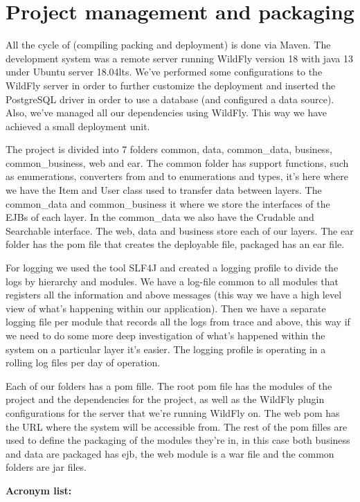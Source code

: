 \documentclass{article}
\begin{document}
\section{Project management and packaging}

\qquad All the cycle of (compiling packing and deployment) is done via Maven. The development system was a remote server running WildFly version 18 with java 13 under Ubuntu server 18.04lts. We've performed some configurations to the WildFly server in order to further customize the deployment and inserted the PostgreSQL driver in order to use a database (and configured a data source). Also, we've managed all our dependencies using WildFly. This way we have achieved a small deployment unit.

\qquad The project is divided into 7 folders common, data, common\_data, business, common\_business, web and ear. The common folder has support functions, such as enumerations, converters from and to enumerations and types, it's here where we have the Item and User class used to transfer data between layers. The common\_data and common\_business it where we store the interfaces of the \ac{EJB}s of each layer. In the common\_data we also have the Crudable and Searchable interface. The web, data and business store each of our layers. The ear folder has the pom file that creates the deployable file, packaged has an ear file.

\qquad For logging we used the tool \ac{SLF4J} and created a logging profile to divide the logs by hierarchy and modules. We have a log-file common to all modules that registers all the information and above messages (this way we have a high level view of what's happening within our application). Then we have a separate logging file per module that records all the logs from trace and above, this way if we need to do some more deep investigation of what's happened within the system on a particular layer it's easier. The logging profile is operating in a rolling log files per day of operation.

\qquad Each of our folders has a pom fille. The root pom file has the modules of the project and the dependencies for the project, as well as the WildFly plugin configurations for the server that we're running WildFly on. The web pom has the URL where the system will be accessible from. The rest of the pom filles are used to define the packaging of the modules they're in, in this case both business and data are packaged has ejb, the web module is a war file and the common folders are jar files.\newline\newline






\textbf{Acronym list:}

\begin{acronym}
\end{acronym}
\end{document}
